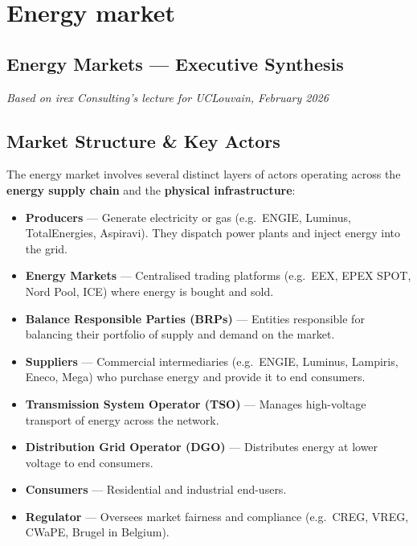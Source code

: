 \chapter{Energy market}


\section*{Energy Markets — Executive Synthesis}
\textit{Based on irex Consulting's lecture for UCLouvain, February 2026}

\section{Market Structure \& Key Actors}

The energy market involves several distinct layers of actors operating across the \textbf{energy supply chain} and the \textbf{physical infrastructure}:

\begin{itemize}[noitemsep]
    \item \textbf{Producers} — Generate electricity or gas (e.g.\ ENGIE, Luminus, TotalEnergies, Aspiravi). They dispatch power plants and inject energy into the grid.
    \item \textbf{Energy Markets} — Centralised trading platforms (e.g.\ EEX, EPEX SPOT, Nord Pool, ICE) where energy is bought and sold.
    \item \textbf{Balance Responsible Parties (BRPs)} — Entities responsible for balancing their portfolio of supply and demand on the market.
    \item \textbf{Suppliers} — Commercial intermediaries (e.g.\ ENGIE, Luminus, Lampiris, Eneco, Mega) who purchase energy and provide it to end consumers.
    \item \textbf{Transmission System Operator (TSO)} — Manages high-voltage transport of energy across the network.
    \item \textbf{Distribution Grid Operator (DGO)} — Distributes energy at lower voltage to end consumers.
    \item \textbf{Consumers} — Residential and industrial end-users.
    \item \textbf{Regulator} — Oversees market fairness and compliance (e.g.\ CREG, VREG, CWaPE, Brugel in Belgium).
\end{itemize}

